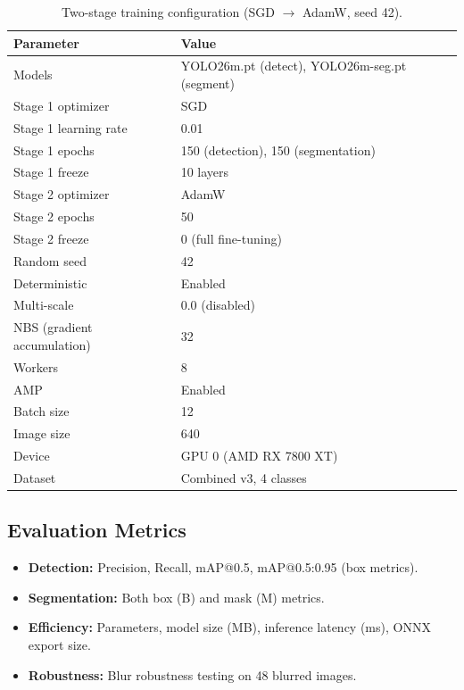\documentclass[a4paper,11pt]{article}
\begin{document}
\begin{table}[H]
\centering
\small
\begin{tabular}{ll}
\toprule
\textbf{Parameter} & \textbf{Value} \\
\midrule
Models & YOLO26m.pt (detect), YOLO26m-seg.pt (segment) \\
Stage 1 optimizer & SGD \\
Stage 1 learning rate & 0.01 \\
Stage 1 epochs & 150 (detection), 150 (segmentation) \\
Stage 1 freeze & 10 layers \\
Stage 2 optimizer & AdamW \\
Stage 2 epochs & 50 \\
Stage 2 freeze & 0 (full fine-tuning) \\
Random seed & 42 \\
Deterministic & Enabled \\
Multi-scale & 0.0 (disabled) \\
NBS (gradient accumulation) & 32 \\
Workers & 8 \\
AMP & Enabled \\
Batch size & 12 \\
Image size & 640 \\
Device & GPU 0 (AMD RX 7800 XT) \\
Dataset & Combined v3, 4 classes \\
\bottomrule
\end{tabular}
\caption{Two-stage training configuration (SGD $\rightarrow$ AdamW, seed 42).}
\label{tab:train_config}
\end{table}

\subsection{Evaluation Metrics}

\begin{itemize}[leftmargin=2cm, itemsep=2pt]
  \item \textbf{Detection:} Precision, Recall, mAP@0.5, mAP@0.5:0.95 (box metrics).
  \item \textbf{Segmentation:} Both box (B) and mask (M) metrics.
  \item \textbf{Efficiency:} Parameters, model size (MB), inference latency (ms), ONNX export size.
  \item \textbf{Robustness:} Blur robustness testing on 48 blurred images.
\end{itemize}
\end{document}
